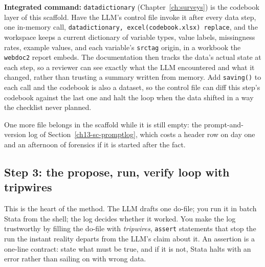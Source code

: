 \documentclass[
    a4paper,
    fontsize=10pt,
    twoside=true,
    numbers=noenddot,
]{kaobook}
\begin{document}
\begin{kaobox}[frametitle=Package Integration: \texttt{datadictionary} as the living codebook]
\textbf{Integrated command:} \texttt{datadictionary} (Chapter~\ref{ch:surveys}) is the codebook layer of this scaffold. Have the LLM's control file invoke it after every data step, one in-memory call, \texttt{datadictionary, excel(codebook.xlsx) replace}, and the workspace keeps a current dictionary of variable types, value labels, missingness rates, example values, and each variable's \texttt{srctag} origin, in a workbook the \texttt{webdoc2} report embeds. The documentation then tracks the data's actual state at each step, so a reviewer can see exactly what the LLM encountered and what it changed, rather than trusting a summary written from memory. Add \texttt{saving()} to each call and the codebook is also a dataset, so the control file can diff this step's codebook against the last one and halt the loop when the data shifted in a way the checklist never planned.
\end{kaobox}

One more file belongs in the scaffold while it is still empty: the prompt-and-version log of Section~\ref{ch13-sc-promptlog}, which costs a header row on day one and an afternoon of forensics if it is started after the fact.

\subsection{Step 3: the propose, run, verify loop with tripwires}
This is the heart of the method. The LLM drafts one do-file; you run it in batch Stata from the shell; the log decides whether it worked. You make the log trustworthy by filling the do-file with \emph{tripwires}, \texttt{assert} statements that stop the run the instant reality departs from the LLM's claim about it. An assertion is a one-line contract: state what must be true, and if it is not, Stata halts with an error rather than sailing on with wrong data.
\end{document}
